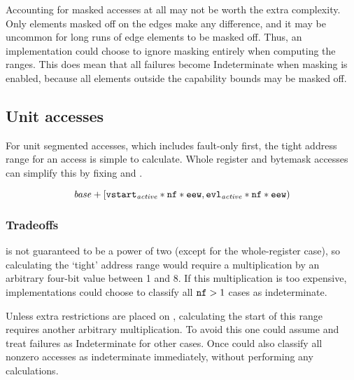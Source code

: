 Accounting for masked accesses at all may not be worth the extra complexity.
Only elements masked off on the edges make any difference, and it may be uncommon for long runs of edge elements to be masked off.
Thus, an implementation could choose to ignore masking entirely when computing the ranges.
This does mean that all failures become Indeterminate when masking is enabled, because all elements outside the capability bounds may be masked off.


\subsection{Unit accesses}
For unit segmented accesses, which includes fault-only first, the tight address range for an access is simple to calculate.
Whole register and bytemask accesses can simplify this by fixing  and .

\begin{equation}
    \mathit{base}{} + [{\texttt{vstart}}_{\mathit{active}}{} * {\texttt{nf}} * {\texttt{eew}}, {\texttt{evl}}_{\mathit{active}}{} * {\texttt{nf}} * {\texttt{eew}})
\end{equation}

\subsubsection*{Tradeoffs}
 is not guaranteed to be a power of two (except for the whole-register case), so calculating the `tight' address range would require a multiplication by an arbitrary four-bit value between 1 and 8.
If this multiplication is too expensive, implementations could choose to classify all ${\texttt{nf}} > 1$ cases as indeterminate.

Unless extra restrictions are placed on , calculating the start of this range requires another arbitrary multiplication.
To avoid this one could assume  and treat failures as Indeterminate for other cases.
Once could also classify all nonzero  accesses as indeterminate immediately, without performing any calculations.

